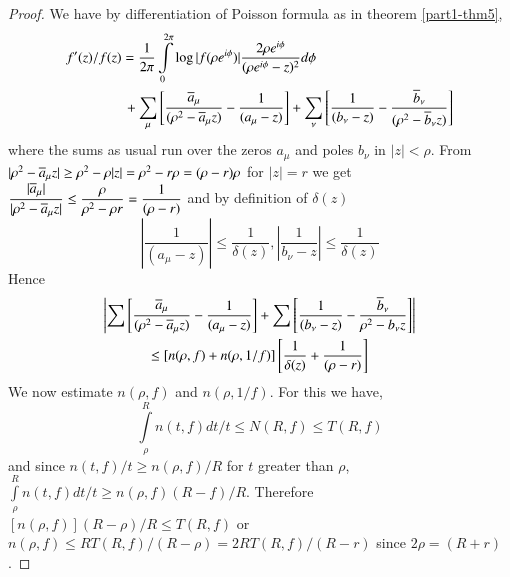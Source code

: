 \begin{proof}
We have by differentiation of Poisson formula as in theorem
\ref{part1-thm5},
\begin{align*}
f'(z)/f(z) &= \frac{1}{2\pi}\int\limits^{2\pi}_{0}\log |f(\rho
e^{i\phi})|\frac{2\rho e^{i\phi}}{(\rho e^{i\phi}-z)^{2}}d\phi\\
&{\,} +\sum_{\mu}\left[\frac{\overline{a}_{\mu}}{(\rho^{2}-\overline{a}_{\mu}z)}-\frac{1}{(a_{\mu}-z)}\right]+\sum_{\nu}\left[\frac{1}{(b_{\nu}-z)}-\frac{\overline{b}_{\nu}}{(\rho^{2}-\overline{b}_{\nu}z)}\right]
\end{align*}
where the sums as usual run over the zeros $a_{\mu}$ and poles
$b_{\nu}$ in $|z|<\rho$. From $|\rho^{2}-\overline{a}_{\mu}z|\geq
\rho^{2}-\rho|z|=\rho^{2}-r\rho=(\rho-r)\rho$ for $|z|=r$ we get
$\dfrac{|\overline{a}_{\mu}|}{|\rho^{2}-\overline{a}_{\mu}z|}\leq
\dfrac{\rho}{\rho^{2}-\rho r}=\dfrac{1}{(\rho-r)}$ and by definition
of $\delta(z)$
$$
\left|\frac{1}{(a_{\mu}-z)}\right|\leq \frac{1}{\delta(z)},
\left|\frac{1}{b_{\nu}-z}\right|\leq \frac{1}{\delta(z)}
$$
Hence\pageoriginale
\begin{gather*}
\left|\sum\left[\frac{\overline{a}_{\mu}}{(\rho^{2}-\overline{a}_{\mu}z)}-\frac{1}{(a_{\mu}-z)}\right]+\sum\left[\frac{1}{(b_{\nu}-z)}-\frac{\overline{b}_{\nu}}{\rho^{2}-b_{\nu}z}\right]\right|\\
\leq
    [n(\rho,f)+n(\rho,1/f)]\left[\frac{1}{\delta(z)}+\frac{1}{(\rho-r)}\right] 
\end{gather*}
We now estimate $n(\rho,f)$ and $n(\rho,1/f)$. For this we have,
$$
\int\limits^{R}_{\rho}n(t,f)dt/t\leq N(R,f)\leq T(R,f)
$$
and since $n(t,f)/t\geq n(\rho,f)/R$ for $t$ greater than $\rho$,
$\int\limits^{R}_{\rho}n(t,f)dt/t\geq n(\rho,f)(R-f)/R$. Therefore
$[n(\rho,f)](R-\rho)/R\leq T(R,f)$ or
$n(\rho,f)\leq RT(R,f)/(R-\rho)=2RT(R,f)/(R-r)$ since $2\rho=(R+r)$. 


\end{proof}

